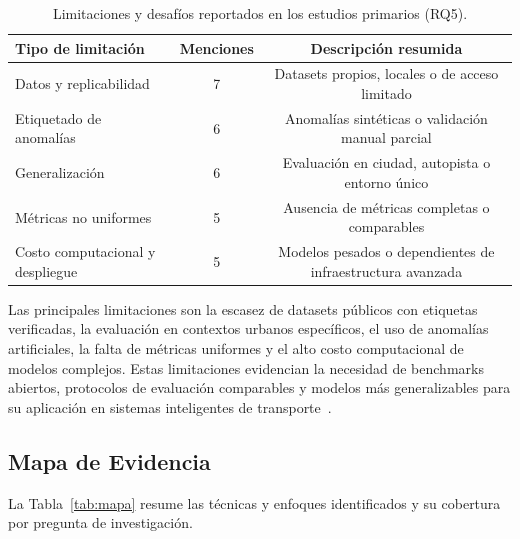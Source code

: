 \documentclass[12pt, a4paper]{article}
\begin{document}
\begin{table}[H]
\centering
\caption{Limitaciones y desaf\'{i}os reportados en los estudios primarios (RQ5).}
\label{tab:rq5}
\small
\begin{tabularx}{\linewidth}{Xcc}
\toprule
\textbf{Tipo de limitaci\'{o}n} & \textbf{Menciones} & \textbf{Descripci\'{o}n resumida} \\
\midrule
Datos y replicabilidad          & 7 & Datasets propios, locales o de acceso limitado \\
Etiquetado de anomal\'{i}as     & 6 & Anomal\'{i}as sint\'{e}ticas o validaci\'{o}n manual parcial \\
Generalizaci\'{o}n              & 6 & Evaluaci\'{o}n en ciudad, autopista o entorno \'{u}nico \\
M\'{e}tricas no uniformes       & 5 & Ausencia de m\'{e}tricas completas o comparables \\
Costo computacional y despliegue & 5 & Modelos pesados o dependientes de infraestructura avanzada \\
\bottomrule
\end{tabularx}
\end{table}

\begin{hallazgo}[]
Las principales limitaciones son la escasez de datasets p\'{u}blicos con etiquetas verificadas, la evaluaci\'{o}n en contextos urbanos espec\'{i}ficos, el uso de anomal\'{i}as artificiales, la falta de m\'{e}tricas uniformes y el alto costo computacional de modelos complejos. Estas limitaciones evidencian la necesidad de benchmarks abiertos, protocolos de evaluaci\'{o}n comparables y modelos m\'{a}s generalizables para su aplicaci\'{o}n en sistemas inteligentes de transporte~\cite{taheri2026applicability,abdallah2025aipurban}.
\end{hallazgo}

\subsection{Mapa de Evidencia}

La Tabla~\ref{tab:mapa} resume las t\'{e}cnicas y enfoques identificados y su cobertura por pregunta de investigaci\'{o}n.
\end{document}
